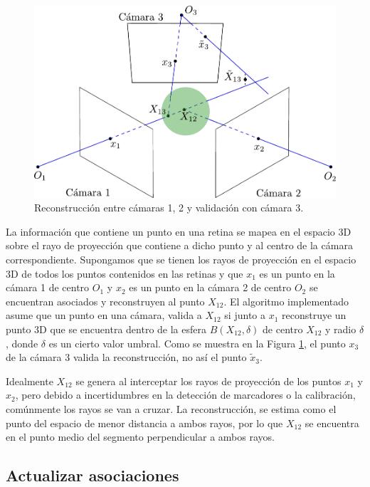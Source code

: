 \begin{figure}[ht!]
\begin{center}
\includegraphics[scale=0.4]{../imagenes/Reconstruccion/validacion.pdf}
\caption{Reconstrucción entre cámaras 1, 2 y validación con cámara 3.}
\label{img_reconstruccion_validacion}
\end{center}
\end{figure}


La información que contiene un punto en una retina se mapea en el espacio 3D sobre el rayo de proyección que contiene a dicho punto y al centro de la cámara correspondiente. Supongamos que se tienen los rayos de proyección en el espacio 3D de todos los puntos contenidos en las retinas y que $x_1$ es un punto en la cámara 1 de centro $O_1$ y $x_2$ es un punto en la cámara 2 de centro $O_2$ se encuentran asociados y reconstruyen al punto $X_{12}$. El algoritmo implementado asume que un punto en una cámara, valida a $X_{12}$ si junto a $x_1$ reconstruye un punto 3D que se encuentra dentro de la esfera $B(X_{12}, \delta)$ de centro $X_{12}$ y radio $\delta$, donde $\delta$ es un cierto valor umbral. Como se muestra en la Figura \ref{img_reconstruccion_validacion}, el punto $x_3$ de la cámara 3 valida la reconstrucción, no así el punto $\tilde{x}_3$. 


Idealmente $X_{12}$ se genera al interceptar los rayos de proyección de los puntos $x_1$ y $x_2$, pero debido a incertidumbres en la detección de marcadores o la calibración, comúnmente los rayos se van a cruzar. La reconstrucción, se estima como el punto del espacio de menor distancia a ambos rayos, por lo que
$X_{12}$ se encuentra en el punto medio del segmento perpendicular a ambos rayos.


\subsection{Actualizar asociaciones}\label{actualizar_asociaciones}

